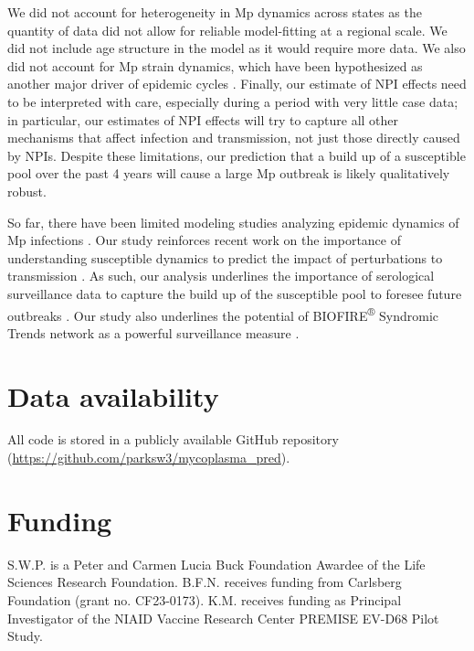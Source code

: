 \documentclass[12pt]{article}
\begin{document}
We did not account for heterogeneity in Mp dynamics across states as the quantity of data did not allow for reliable model-fitting at a regional scale.
We did not include age structure in the model as it would require more data.
We also did not account for Mp strain dynamics, which have been hypothesized as another major driver of epidemic cycles \citep{kenri2008genotyping,zhang2019positively}.
Finally, our estimate of NPI effects need to be interpreted with care, especially during a period with very little case data;
in particular, our estimates of NPI effects will try to capture all other mechanisms that affect infection and transmission, not just those directly caused by NPIs.
Despite these limitations, our prediction that a build up of a susceptible pool over the past 4 years will cause a large Mp outbreak is likely qualitatively robust.

So far, there have been limited modeling studies analyzing epidemic dynamics of Mp infections \citep{omori2015determinant,zhang2019positively}. 
Our study reinforces recent work on the importance of understanding susceptible dynamics to predict the impact of perturbations to transmission \citep{baker2020impact,park2024predicting}.
As such, our analysis underlines the importance of serological surveillance data to capture the build up of the susceptible pool to foresee future outbreaks \citep{mina2020global,nguyen2022enterovirus}.
Our study also underlines the potential of BIOFIRE\textsuperscript{®} Syndromic Trends network as a powerful surveillance measure \citep{park2021epidemiological}.

\section*{Data availability}

All code is stored in a publicly available GitHub repository (\url{https://github.com/parksw3/mycoplasma_pred}).

\section*{Funding}

S.W.P. is a Peter and Carmen Lucia Buck Foundation Awardee of the Life Sciences Research Foundation.
B.F.N. receives funding from Carlsberg Foundation (grant no. CF23-0173).
K.M. receives funding as Principal Investigator of the NIAID Vaccine Research Center PREMISE EV-D68 Pilot Study.
\end{document}
